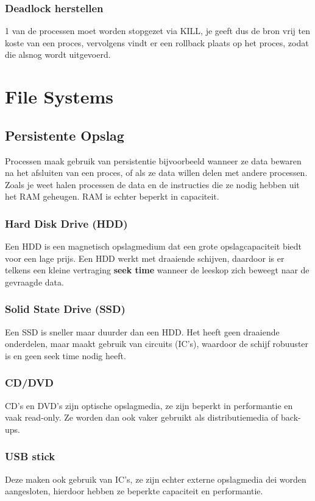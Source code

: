 \documentclass{report}
\begin{document}
   			\subsection{Deadlock herstellen}
   				1 van de processen moet worden stopgezet via KILL, je geeft dus de bron vrij ten koste van een proces, vervolgens vindt er een rollback plaats op het proces, zodat die alsnog wordt uitgevoerd. 
   	\chapter{File Systems}
   		\section{Persistente Opslag}
   			Processen maak gebruik van persistentie bijvoorbeeld wanneer ze data bewaren na het afsluiten van een proces, of als ze data willen delen met andere processen. Zoals je weet halen processen de data en de instructies die ze nodig hebben uit het RAM geheugen. RAM is echter beperkt in capaciteit. 
   			\subsection{Hard Disk Drive (HDD)}
   				Een HDD is een magnetisch opslagmedium dat een grote opslagcapaciteit biedt voor een lage prijs. Een HDD werkt met draaiende schijven, daardoor is er telkens een kleine vertraging \textbf{seek time} wanneer de leeskop zich beweegt naar de gevraagde data.
   			\subsection{Solid State Drive (SSD)}
   				Een SSD is sneller maar duurder dan een HDD. Het heeft geen draaiende onderdelen, maar maakt gebruik van circuits (IC's), waardoor de schijf robuuster is en geen seek time nodig heeft. 
   			\subsection{CD/DVD}
   				CD's en DVD's zijn optische opslagmedia, ze zijn beperkt in performantie en vaak read-only. Ze worden dan ook vaker gebruikt als distributiemedia of back-ups. 
   			\subsection{USB stick}
   				Deze maken ook gebruik van IC's, ze zijn echter externe opslagmedia dei worden aangesloten, hierdoor hebben ze beperkte capaciteit en performantie. 
\end{document}
